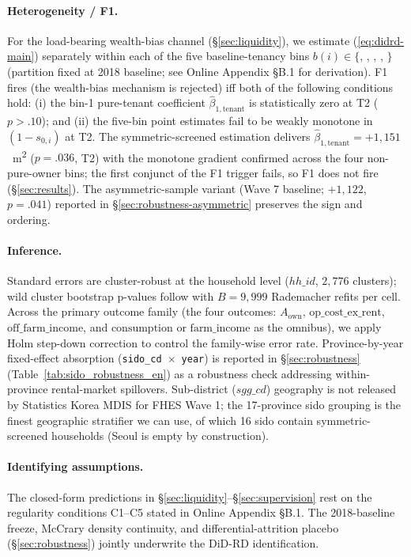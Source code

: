 \documentclass[12pt, a4paper]{article}
\begin{document}
\paragraph{Heterogeneity / F1.} For the load-bearing wealth-bias channel (\S\ref{sec:liquidity}), we estimate (\ref{eq:didrd-main}) separately within each of the five baseline-tenancy bins $b(i) \in \{$, , , , $\}$ (partition fixed at 2018 baseline; see Online Appendix \S B.1 for derivation). F1 fires (the wealth-bias mechanism is rejected) iff both of the following conditions hold: (i) the bin-1 pure-tenant coefficient $\hat\beta_{1,\text{tenant}}$ is statistically zero at T2 ($p > .10$); and (ii) the five-bin point estimates fail to be weakly monotone in $(1 - s_{0,i})$ at T2. The symmetric-screened estimation delivers $\hat\beta_{1,\text{tenant}} = +1{,}151$~m\textsuperscript{2} ($p = .036$, T2) with the monotone gradient confirmed across the four non-pure-owner bins; the first conjunct of the F1 trigger fails, so F1 does not fire (\S\ref{sec:results}). The asymmetric-sample variant (Wave 7 baseline; $+1{,}122$, $p = .041$) reported in \S\ref{sec:robustness-asymmetric} preserves the sign and ordering.

\paragraph{Inference.} Standard errors are cluster-robust at the household level ($hh\_id$, $2{,}776$ clusters); wild cluster bootstrap p-values follow \citet{CameronGelbachMiller2008_clusterboot} with $B = 9{,}999$ Rademacher refits per cell. Across the primary outcome family (the four outcomes: $A_{\text{own}}$, $\text{op\_cost\_ex\_rent}$, $\text{off\_farm\_income}$, and $\text{consumption}$ or $\text{farm\_income}$ as the omnibus), we apply Holm step-down correction to control the family-wise error rate. Province-by-year fixed-effect absorption (\texttt{sido\_cd}~$\times$~\texttt{year}) is reported in \S\ref{sec:robustness} (Table~\ref{tab:sido_robustness_en}) as a robustness check addressing within-province rental-market spillovers. Sub-district ($sgg\_cd$) geography is not released by Statistics Korea MDIS for FHES Wave 1; the 17-province sido grouping is the finest geographic stratifier we can use, of which 16 sido contain symmetric-screened households (Seoul is empty by construction).

\paragraph{Identifying assumptions.} The closed-form predictions in \S\ref{sec:liquidity}--\S\ref{sec:supervision} rest on the regularity conditions C1--C5 stated in Online Appendix \S B.1. The 2018-baseline freeze, McCrary density continuity, and differential-attrition placebo (\S\ref{sec:robustness}) jointly underwrite the DiD-RD identification.
\end{document}
